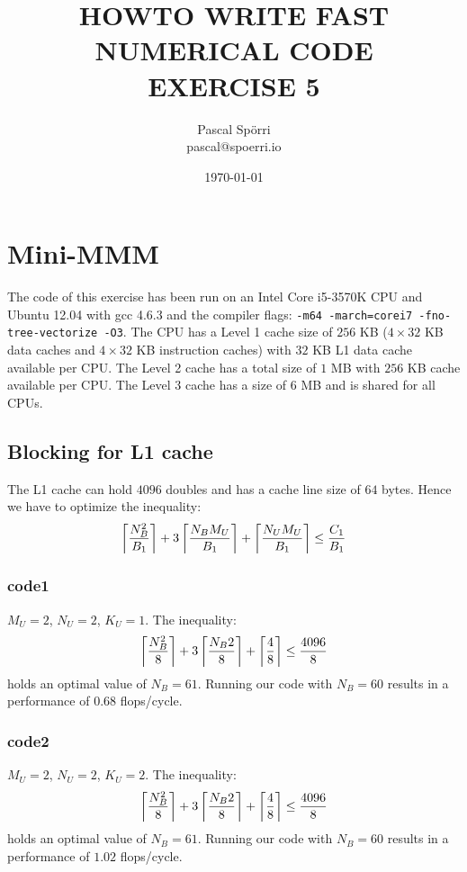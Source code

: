 \documentclass[portrait,a4paper]{article}
\begin{document}
 \author{Pascal Spörri\\pascal@spoerri.io}
 \title{HOWTO WRITE FAST NUMERICAL CODE\\ EXERCISE 5}
 \date{\today}
\maketitle

\section{Mini-MMM}
The code of this exercise has been run on an Intel Core i5-3570K CPU and Ubuntu 12.04 with gcc 4.6.3 and the compiler flags: \lstinline{-m64 -march=corei7 -fno-tree-vectorize -O3}. The CPU has a Level 1 cache size of $256$ KB ($4\times 32$ KB data caches and $4\times 32$ KB instruction caches) with $32$ KB L1 data cache available per CPU. The Level 2 cache has a total size of $1$ MB with $256$ KB cache available per CPU. The Level 3 cache has a size of $6$ MB and is shared for all CPUs.

\subsection{Blocking for L1 cache}
The L1 cache can hold $4096$ doubles and has a cache line size of $64$ bytes. Hence we have to optimize the inequality:
\begin{align*}
    \left\lceil {N_B^2 \over B_1} \right\rceil + 3\left\lceil {N_B M_U \over B_1} \right\rceil
    + \left\lceil {N_U M_U \over B_1} \right\rceil \leq {C_1 \over B_1}
\end{align*}


\subsubsection{code1}
$M_U=2$, $N_U=2$, $K_U=1$. The inequality:
\begin{align*}
    \left\lceil {N_B^2 \over 8} \right\rceil + 3\left\lceil {N_B 2 \over 8} \right\rceil
    + \left\lceil {4 \over 8} \right\rceil \leq {4096 \over 8}
\end{align*}
holds an optimal value of $N_B=61$.  Running our code with $N_B=60$ results in a performance of $0.68$ flops/cycle.
\subsubsection{code2}
$M_U=2$, $N_U=2$, $K_U=2$. The inequality:
\begin{align*}
    \left\lceil {N_B^2 \over 8} \right\rceil + 3\left\lceil {N_B 2 \over 8} \right\rceil
    + \left\lceil {4\over 8} \right\rceil \leq {4096 \over 8}
\end{align*}
holds an optimal value of $N_B=61$. Running our code with $N_B=60$ results in a performance of $1.02$ flops/cycle.
\end{document}

